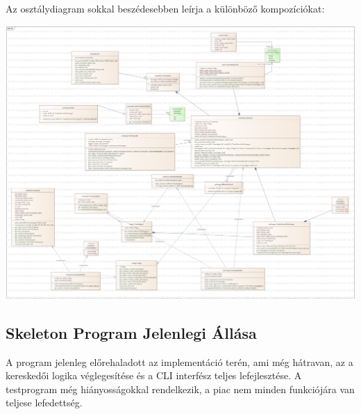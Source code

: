 \documentclass{article}[12pt,a4paper]
\begin{document}
    Az osztálydiagram sokkal beszédesebben leírja a különböző kompozíciókat:
    \begin{center}
        \includegraphics[scale=0.20]{cli}
    \end{center}

    \subsection{Skeleton Program Jelenlegi Állása}
    A program jelenleg előrehaladott az implementáció terén, ami még hátravan, az a kereskedői logika véglegesítése és a CLI interfész teljes lefejlesztése.
    A testprogram még hiányosságokkal rendelkezik, a piac nem minden funkciójára van teljese lefedettség.
\end{document}
